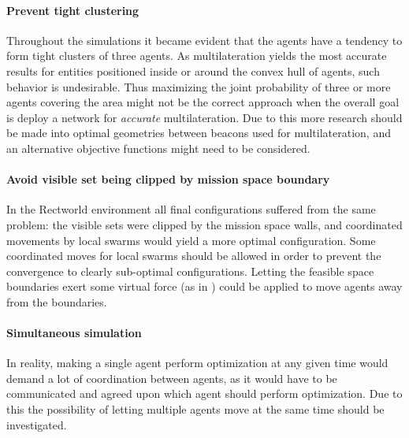 \paragraph{Prevent tight clustering}
Throughout the simulations it became evident that the agents have a tendency to form tight clusters of three agents.
As multilateration yields the most accurate results for entities positioned inside or around the convex hull of agents,
such behavior is undesirable. Thus maximizing the joint probability of three or more agents covering the area might not be the 
correct approach when the overall goal is deploy a network for \emph{accurate} multilateration. Due to this more research should be made into
optimal geometries between beacons used for multilateration, and an alternative objective functions might need to be considered.

\paragraph{Avoid visible set being clipped by mission space boundary}
In the Rectworld environment all final configurations suffered from the same problem: the visible sets were clipped by the mission
space walls, and coordinated movements by local swarms would yield a more optimal configuration. 
Some coordinated moves for local swarms should be allowed in order to prevent the convergence to 
clearly sub-optimal configurations. Letting the feasible space boundaries exert some virtual force (as in \cite{pot_field}) could be 
applied to move agents away from the boundaries.

\paragraph{Simultaneous simulation} In reality, making a single agent perform optimization at any given time would demand
a lot of coordination between agents, as it would have to be communicated and agreed upon which agent should perform optimization.
Due to this the possibility of letting multiple agents move at the same time should be investigated.